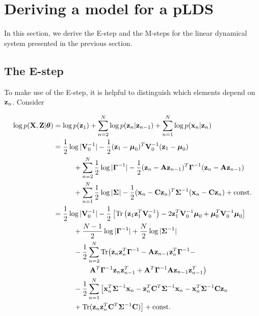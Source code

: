 \documentclass[11pt]{article}
\numberwithin{equation}{section}
\newcommand{\x}{{\bf x}}
\newcommand{\z}{{\bf z}}
\begin{document}

\section{Deriving a model for a pLDS}
In this section, we derive the E-step and the M-steps for the linear dynamical system presented in the previous section.

\subsection{The E-step}
To make use of the E-step, it is helpful to distinguish which elements depend on $\z_n$. Consider

\begin{align}
	\log p({\bf X}, {\bf Z}\vert \boldsymbol\theta) &= \log p(\z_1) + \sum_{n=2}^N \log p(\z_n\vert \z_{n-1}) + \sum_{n=1}^N \log p(\x_n\vert \z_n)\\
	   &=\frac{1}{2}\log\vert{\bf V}_0^{-1}\vert - \frac{1}{2}(\z_1 - \boldsymbol\mu_0)^T{\bf V}_0^{-1}(\z_1 - \boldsymbol\mu_0) \nonumber \\
	   &\hspace{1cm}+ \sum_{n=2}^N \frac{1}{2}\log\vert\boldsymbol\Gamma^{-1}\vert - \frac{1}{2}(\z_n - {\bf A z}_{n-1})^T\boldsymbol{\Gamma}^{-1}(\z_n - {\bf A z}_{n-1}) \nonumber \\
	   &\hspace{1cm}+\sum_{n=1}^N \frac{1}{2}\log\vert\boldsymbol\Sigma\vert -\frac{1}{2}(\x_n - {\bf C z}_n)^T \boldsymbol{\Sigma}^{-1}(\x_n - {\bf C z}_n) + \text{const.}\\
	   &= \frac{1}{2}\log \vert
	  {\bf V}_0^{-1}\vert -\frac{1}{2}\left[\text{Tr}\left(\z_1 \z_1^T {\bf V}_0^{-1}\right) -2 \z_1^T{\bf V}_0^{-1}\boldsymbol\mu_0 + \boldsymbol\mu_0^T {\bf V}_0^{-1}\boldsymbol\mu_0\right] \nonumber \\
	  &\hspace{1cm}+ \frac{N-1}{2}\log\vert\boldsymbol\Gamma^{-1}\vert + \frac{N}{2}\log\vert \boldsymbol\Sigma^{-1}\vert \nonumber \\
	  &\hspace{1cm}-\frac{1}{2} \sum_{n=2}^{N}\text{Tr}\big(\z_n\z_n^T\boldsymbol\Gamma^{-1} -{\bf A} \z_{n-1}\z_n^T\boldsymbol\Gamma^{-1} - \nonumber\\
	  &\hspace{1.8cm}{\bf A}^T\boldsymbol{\Gamma}^{-1}\z_n\z_{n-1}^T + {\bf A}^T \boldsymbol\Gamma^{-1}{\bf A}\z_{n-1}\z_{n-1}^T\big) \nonumber\\
	  &\hspace{1cm}-\frac{1}{2}\sum_{n=1}^N\big[\x_n^T\boldsymbol{\Sigma}^{-1}\x_n - \z_n^T{\bf C}^T\boldsymbol\Sigma^{-1}\x_n - \x_n^T\boldsymbol{\Sigma}^{-1}{\bf C}\z_n  \\
	  &\hspace{1cm} + \text{Tr}(\z_n\z_n^T{\bf C}^T\boldsymbol\Sigma^{-1}{\bf C})\big] + \text{const.} \label{eq:complete-log-likelihood}
\end{align}
\end{document}
